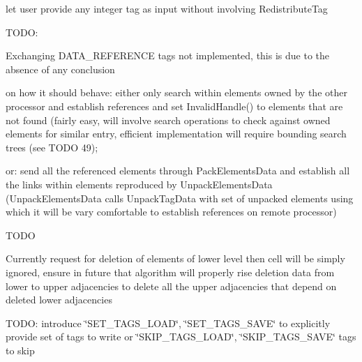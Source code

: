 \begin{DoxyRefList}
\begin{DoxyEnumerate}
\item let user provide any integer tag as input without involving Redistribute\-Tag 
\end{DoxyEnumerate}
\item[\label{todo__todo000007}%
\hypertarget{todo__todo000007}{}%
Member \hyperlink{classINMOST_1_1Mesh_a2d488479041917c975b1e662d642c4a5}{I\-N\-M\-O\-S\-T\-:\-:Mesh\-:\-:Reduce\-Data} (const Tag \&tag, Element\-Type mask, Marker\-Type select, Reduce\-Operation op)]T\-O\-D\-O\-:
\begin{DoxyEnumerate}
\item Exchanging D\-A\-T\-A\-\_\-\-R\-E\-F\-E\-R\-E\-N\-C\-E tags not implemented, this is due to the absence of any conclusion
\end{DoxyEnumerate}
\begin{DoxyItemize}
\item on how it should behave\-: either only search within elements owned by the other processor and establish references and set Invalid\-Handle() to elements that are not found (fairly easy, will involve search operations to check against owned elements for similar entry, efficient implementation will require bounding search trees (see T\-O\-D\-O 49);
\item or\-: send all the referenced elements through Pack\-Elements\-Data and establish all the links within elements reproduced by Unpack\-Elements\-Data (Unpack\-Elements\-Data calls Unpack\-Tag\-Data with set of unpacked elements using which it will be vary comfortable to establish references on remote processor) 
\end{DoxyItemize}
\item[\label{todo__todo000004}%
\hypertarget{todo__todo000004}{}%
Member \hyperlink{classINMOST_1_1Mesh_a5cb95f1e8d6b7987496fc8276c86cf3a}{I\-N\-M\-O\-S\-T\-:\-:Mesh\-:\-:Remove\-Ghost\-Elements} (const Handle\-Type $\ast$ghost, enumerator num)]T\-O\-D\-O
\begin{DoxyEnumerate}
\item Currently request for deletion of elements of lower level then cell will be simply ignored, ensure in future that algorithm will properly rise deletion data from lower to upper adjacencies to delete all the upper adjacencies that depend on deleted lower adjacencies  
\end{DoxyEnumerate}
\item[\label{todo__todo000010}%
\hypertarget{todo__todo000010}{}%
Member \hyperlink{classINMOST_1_1Mesh_a07c75e9dee2c400225a6095e45489ac1}{I\-N\-M\-O\-S\-T\-:\-:Mesh\-:\-:Set\-File\-Option} (std\-::string, std\-::string)]T\-O\-D\-O\-: introduce \char`\"{}\-S\-E\-T\-\_\-\-T\-A\-G\-S\-\_\-\-L\-O\-A\-D\char`\"{}, \char`\"{}\-S\-E\-T\-\_\-\-T\-A\-G\-S\-\_\-\-S\-A\-V\-E\char`\"{} to explicitly provide set of tags to write or \char`\"{}\-S\-K\-I\-P\-\_\-\-T\-A\-G\-S\-\_\-\-L\-O\-A\-D\char`\"{}, \char`\"{}\-S\-K\-I\-P\-\_\-\-T\-A\-G\-S\-\_\-\-S\-A\-V\-E\char`\"{} tags to skip  

\end{DoxyRefList}
